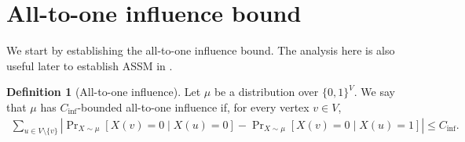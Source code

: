 \documentclass[11pt]{amsart}
\renewcommand{\Pr}{\mathop{\mathrm{Pr}}\nolimits}
\newcommand{\abs}[1]{\ensuremath{\left\vert#1\right\vert}}
\theoremstyle{definition}
\newtheorem{condition}[theorem]{Condition}
\newtheorem{definition}[theorem]{Definition}
\theoremstyle{remark}
\begin{document}

\section{All-to-one influence bound}

We start by establishing the all-to-one influence bound.
The analysis here is also useful later to establish ASSM in .

\begin{definition}[All-to-one influence]\label{def:all-to-one-influence}
    Let $\mu$ be a distribution over $\{0,1\}^V$. We say that $\mu$ has $C_{\text{inf}}$-bounded all-to-one influence if, for every vertex $v \in V$,
\begin{align*}
    \sum_{u \in V\setminus\{v\}}\abs{\Pr_{X\sim \mu}[X(v) = 0 \mid X(u) = 0] -
    \Pr_{X\sim \mu}[X(v) = 0 \mid X(u) = 1]} \leq C_{\text{inf}}.
\end{align*}
\end{definition}

\end{document}
